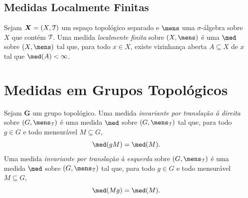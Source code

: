 
\subsection{Medidas Localmente Finitas}

\begin{defi}
Sejam $\bm X = (X,\mathcal{T})$ um espaço topológico separado e $\mens$ uma $\sigma$-álgebra sobre $X$ que contém $\mathcal{T}$. Uma medida \emph{localmente finita} sobre $(X,\mens)$ é uma $\med$ sobre $(X,\mens)$ tal que, para todo $x \in X$, existe vizinhança aberta $A \subseteq X$ de $x$ tal que $\med(A) < \infty$.\end{defi}



\section{Medidas em Grupos Topológicos}

\begin{defi}
Sejam $\bm G$ um grupo topológico. Uma medida \emph{invariante por translação à direita} sobre $(G,\mens_\topo)$ é uma medida $\med$ sobre $(G,\mens_\topo)$ tal que, para todo $g \in G$ e todo mensurável $M \subseteq G$,
	\begin{equation*}
	\med(gM) = \med(M).
	\end{equation*}
Uma medida \emph{invariante por translação à esquerda} sobre $(G,\mens_\topo)$ é uma medida $\med$ sobre $(G,\mens_\topo)$ tal que, para todo $g \in G$ e todo mensurável $M \subseteq G$,
	\begin{equation*}
	\med(Mg) = \med(M).
	\end{equation*}
\end{defi}

